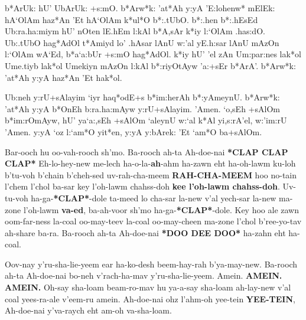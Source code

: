 \documentclass[12pt]{article}
\newenvironment{hebrewPrayer}
    {\begin{cjhebrew}
     \Large
    }
    { 
    \end{cjhebrew}
    }
\newenvironment{hebrewTransliteration}{}{\par}
\newcommand{\hebrewVowelOh}{\textrm{\hspace{0.2em}}o\textrm{\hspace{-0.2em}}}
\newcommand{\hebrewVowelDotDotL}{e} %
\newcommand{\transliterateAdonai}{Ah-doe-nai}
\newcommand{\baruchAdonai}{b*Arw*k: 'at*Ah y:yA}
\newcommand{\transliterateBaruchAdonai}{Ba-rooch ah-ta {\transliterateAdonai}}
\newcommand{\baruchHaolam}{{\baruchAdonai} 'E:loh{\hebrewVowelDotDotL}nw* mElEk: hA`OlAm}
\begin{document}
\begin{hebrewPrayer}
    b*ArUk: hU' UbArUk: +s:mO\textrm{.} {\baruchHaolam} haz*An 'Et hA`OlAm k*ul*O b*:.tUbO\textrm{.} b*:.hen b*:.hEsEd Ub:ra.ha:miym hU' nOten lE.hEm l:kAl b*A,sAr k*iy l:`OlAm .has:dO\textrm{.} Ub:.tUbO hag*AdOl t*Amiyd \hbox{l{\hebrewVowelOh}'} .hAsar lAnU w:'al yE.h:sar lAnU mAzOn l:`OlAm wA`Ed\textrm{,} b*a`a:bUr +s:mO hag*AdOl\textrm{.} k*iy hU' 'el zAn Um:par:nes \hbox{lak*{\hebrewVowelOh}l} Ume.tiyb \hbox{lak*{\hebrewVowelOh}l} Umekiyn mAzOn l:kAl b*:riyOtAyw 'a:+sEr b*ArA'\textrm{.} {\baruchAdonai} haz*An 'Et \hbox{hak*{\hebrewVowelOh}l}\textrm{.}
    
    Ub:neh y:rU+sAlayim `iyr \hbox{haq*{\hebrewVowelOh}dE+s} b*im:herAh b*:yAmeynU\textrm{.} {\baruchAdonai} b*OnEh b:ra.ha:mAyw y:rU+sAlayim\textrm{.} 'Amen\textrm{.} \hbox{`{\hebrewVowelOh},sEh} +sAlOm b*im:rOmAyw\textrm{,} hU' ya`a:,sEh +sAlOm `aleynU w:`al k*Al yi,s:rA'el\textrm{,} w:'im:rU 'Amen\textrm{.} y:yA \hbox{`{\hebrewVowelOh}z} l:`am*O yit*en\textrm{,} y:yA y:bArek: 'Et `am*O ba+sAlOm\textrm{.}

\end{hebrewPrayer}

\begin{hebrewTransliteration}
    Bar-ooch hu oo-vah-rooch sh'mo. {\transliterateBaruchAdonai} \textbf{*CLAP CLAP CLAP*} Eh-lo-hey-new me-lech ha-o-la-\textbf{ah}-ahm ha-zawn eht ha-oh-lawm ku-loh b'tu-voh b'chain b'cheh-sed uv-rah-cha-meem \textbf{RAH-CHA-MEEM} hoo no-tain l'chem l'chol ba-sar key l'oh-lawm chahss-doh \textbf{kee l'oh-lawm chahss-doh}. Uv-tu-voh ha-ga-\textbf{*CLAP*}-dole ta-meed lo cha-sar la-new v'al yech-sar la-new ma-zone l'oh-lawm \textbf{va-ed}, ba-ah-voor sh'mo ha-ga-\textbf{*CLAP*}-dole. Key hoo ale zawn oom-far-ness la-coal oo-may-teev la-coal oo-may-cheen ma-zone l'chol b'ree-yo-tav ah-share ba-ra. {\transliterateBaruchAdonai} \textbf{*DOO DEE DOO*} ha-zahn eht ha-coal.
    
    Oov-nay y'ru-sha-lie-yeem ear ha-ko-desh beem-hay-rah b'ya-may-new. {\transliterateBaruchAdonai} bo-neh v'rach-ha-mav y'ru-sha-lie-yeem. Amein. \textbf{AMEIN. AMEIN.} Oh-say sha-loam beam-ro-mav hu ya-a-say sha-loam ah-lay-new v'al coal yees-ra-ale v'eem-ru amein. {\transliterateAdonai} ohz l'ahm-oh yee-tein \textbf{YEE-TEIN}, {\transliterateAdonai} y'va-raych eht am-oh va-sha-loam.
\end{hebrewTransliteration}
\end{document}
